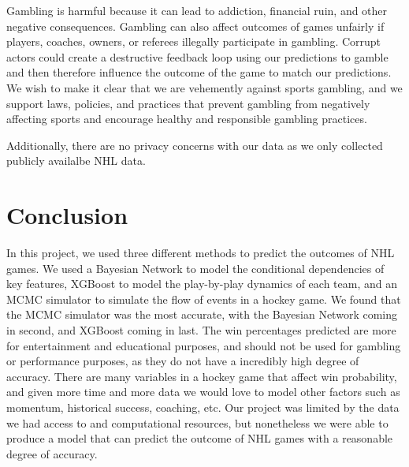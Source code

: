 \documentclass[11pt]{article}
\begin{document}
Gambling is harmful because it can lead to addiction, financial ruin, and other negative consequences. Gambling can also affect outcomes of games unfairly if players, coaches, owners, or referees illegally participate in gambling. Corrupt actors could create a destructive feedback loop using our predictions to gamble and then therefore influence the outcome of the game to match our predictions.
We wish to make it clear that we are vehemently against sports gambling, and we support laws, policies, and practices that prevent gambling from negatively affecting sports and encourage healthy and responsible gambling practices.

Additionally, there are no privacy concerns with our data as we only collected publicly availalbe NHL data.

\section{Conclusion}

In this project, we used three different methods to predict the outcomes of NHL games. We used a Bayesian Network to model the conditional dependencies of key features, XGBoost to model the play-by-play dynamics of each team, and an MCMC simulator to simulate the flow of events in a hockey game. We found that the MCMC simulator was the most accurate, with the Bayesian Network coming in second, and XGBoost coming in last. 
The win percentages predicted are more for entertainment and educational purposes, and should not be used for gambling or performance purposes, as they do not have a incredibly high degree of accuracy. There are many variables in a hockey game that affect win probability, and given more time and more data we would love to model other factors such as momentum, historical success, coaching, etc. Our project was limited by the data
we had access to and computational resources, but nonetheless we were able to produce a model that can predict the outcome of NHL games with a reasonable degree of accuracy.

\newpage


\end{document}
